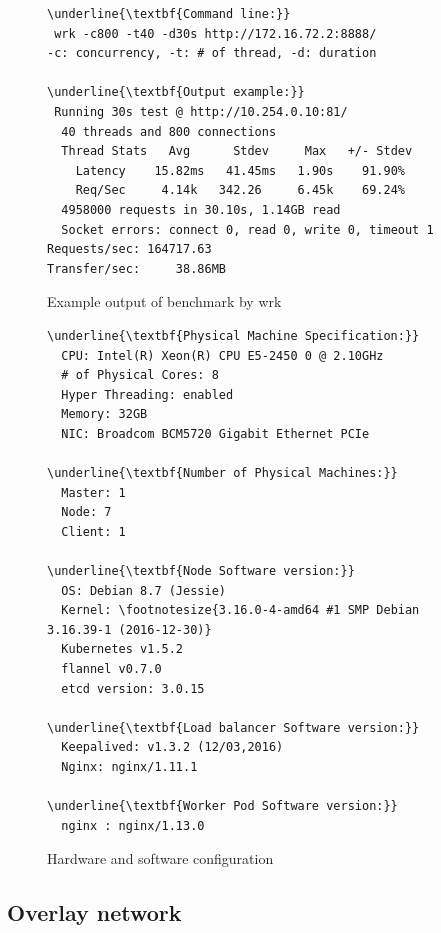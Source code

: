 \begin{figure}
\begin{minipage}{\columnwidth}
\small
\begin{Verbatim}[commandchars=\\\{\}]
\underline{\textbf{Command line:}}
 wrk -c800 -t40 -d30s http://172.16.72.2:8888/
-c: concurrency, -t: # of thread, -d: duration

\underline{\textbf{Output example:}}
 Running 30s test @ http://10.254.0.10:81/
  40 threads and 800 connections
  Thread Stats   Avg      Stdev     Max   +/- Stdev
    Latency    15.82ms   41.45ms   1.90s    91.90%
    Req/Sec     4.14k   342.26     6.45k    69.24%
  4958000 requests in 30.10s, 1.14GB read
  Socket errors: connect 0, read 0, write 0, timeout 1
Requests/sec: 164717.63
Transfer/sec:     38.86MB
\end{Verbatim}
\end{minipage}
\caption{Example output of benchmark by wrk}
\label{fig:benchmark example}
\end{figure}

\begin{figure}
\begin{minipage}{0.9\columnwidth}
\small
\begin{Verbatim}[commandchars=\\\{\}]
\underline{\textbf{Physical Machine Specification:}}
  CPU: Intel(R) Xeon(R) CPU E5-2450 0 @ 2.10GHz
  # of Physical Cores: 8
  Hyper Threading: enabled
  Memory: 32GB
  NIC: Broadcom BCM5720 Gigabit Ethernet PCIe

\underline{\textbf{Number of Physical Machines:}}
  Master: 1
  Node: 7
  Client: 1

\underline{\textbf{Node Software version:}}
  OS: Debian 8.7 (Jessie)
  Kernel: \footnotesize{3.16.0-4-amd64 #1 SMP Debian 3.16.39-1 (2016-12-30)}
  Kubernetes v1.5.2
  flannel v0.7.0
  etcd version: 3.0.15

\underline{\textbf{Load balancer Software version:}}
  Keepalived: v1.3.2 (12/03,2016)
  Nginx: nginx/1.11.1

\underline{\textbf{Worker Pod Software version:}}
  nginx : nginx/1.13.0 
\end{Verbatim}
\end{minipage}
\caption{Hardware and software configuration}
\label{fig:Hardware and software configuration}
\end{figure}


\subsection{Overlay network}

